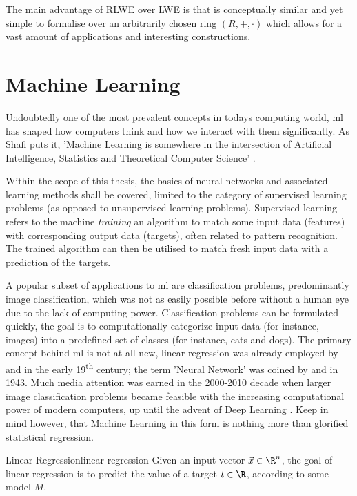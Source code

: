 The main advantage of RLWE over LWE is that is conceptually similar and yet simple to formalise over an arbitrarily chosen \hyperref[def:ring]{ring} $(R, +, \cdot)$ which allows for a vast amount of applications and interesting constructions.

\pagebreak
\section{Machine Learning}
Undoubtedly one of the most prevalent concepts in todays computing world, \gls{ml} has shaped how computers think and how we interact with them significantly.
As Shafi  puts it, 'Machine Learning is somewhere in the intersection of Artificial Intelligence, Statistics and Theoretical Computer Science' \parencite{goldwasserTalk2018}.

Within the scope of this thesis, the basics of neural networks and associated learning methods shall be covered, limited to the category of supervised learning problems (as opposed to unsupervised learning problems).
Supervised learning refers to the machine \textit{training} an algorithm to match some input data (features) with corresponding output data (targets), often related to pattern recognition.
The trained algorithm can then be utilised to match fresh input data with a prediction of the targets.

A popular subset of applications to \gls{ml} are classification problems, predominantly image classification, which was not as easily possible before without a human eye due to the lack of computing power.
Classification problems can be formulated quickly, the goal is to computationally categorize input data (for instance, images) into a predefined set of classes (for instance, cats and dogs).
The primary concept behind \acrlong{ml} is not at all new, linear regression was already employed by  and  in the early 19\textsuperscript{th} century; the term 'Neural Network' was coined by  and  in 1943.
Much media attention was earned in the 2000-2010 decade when larger image classification problems became feasible with the increasing computational power of modern computers, up until the advent of Deep Learning \parencite{bishop-pattern-recognition-and-ml}.
Keep in mind however, that Machine Learning in this form is nothing more than glorified statistical regression.

\begin{definition}{Linear Regression}{linear-regression}
  Given an input vector $\vec{x} \in \R^n$, the goal of linear regression is to predict the value of a target $t \in \R$, according to some model $M$.
\end{definition}

